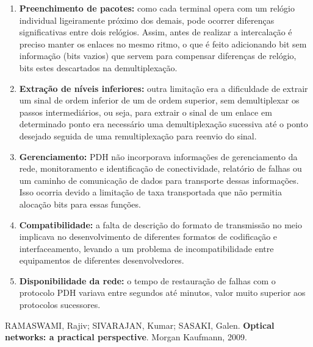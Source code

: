 \documentclass[a4paper,12pt]{article}
\begin{document}
\begin{enumerate}


\item {\bf Preenchimento de pacotes:} como cada terminal opera com um relógio individual ligeiramente próximo dos demais, pode ocorrer diferenças significativas entre dois relógios. Assim, antes de realizar a intercalação é preciso manter os enlaces no mesmo ritmo, o que é feito adicionando bit sem informação (bits vazios) que servem para  compensar diferenças de relógio, bits estes descartados na demultiplexação.

\item {\bf Extração de níveis inferiores:} outra limitação era a dificuldade de extrair um sinal de ordem inferior de um de ordem superior, sem demultiplexar os passos intermediários, ou seja, para extrair o sinal de um enlace em determinado ponto era necessário uma demultiplexação sucessiva até o ponto desejado seguida de uma remultiplexação para reenvio do sinal.
\item {\bf Gerenciamento:} PDH não incorporava informações de gerenciamento da rede, monitoramento e identificação de conectividade, relatório de falhas ou um caminho de comunicação de dados para transporte dessas informações. Isso ocorria devido a limitação de taxa transportada que não permitia alocação bits para essas funções.
\item {\bf Compatibilidade:} a falta de descrição do formato de transmissão no meio implicava no desenvolvimento de diferentes formatos de codificação e interfaceamento, levando a um problema de incompatibilidade entre equipamentos de diferentes desenvolvedores.
\item {\bf Disponibilidade da rede:} o tempo de restauração de falhas com o protocolo PDH variava entre segundos até minutos, valor muito superior aos protocolos sucessores.

\end{enumerate}

\begin{thebibliography}{10}


  RAMASWAMI, Rajiv; SIVARAJAN, Kumar; SASAKI, Galen. {\bf Optical networks: a practical perspective}. Morgan Kaufmann, 2009.

\end{thebibliography}
\end{document}
